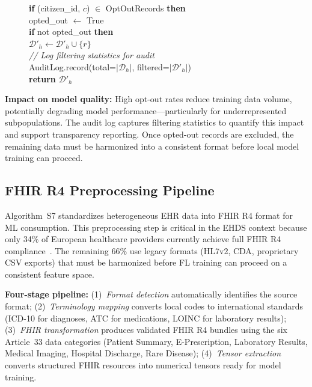 \documentclass[conference]{IEEEtran}
\begin{document}
\begin{figure}[htbp]
{{\hspace*{8mm}\textbf{if} (citizen\_id, $c$) $\in$ OptOutRecords \textbf{then}\\
\hspace*{12mm}opted\_out $\leftarrow$ True\\
\hspace*{4mm}\textbf{if} not opted\_out \textbf{then}\\
\hspace*{8mm}$\mathcal{D}'_h \leftarrow \mathcal{D}'_h \cup \{r\}$\\[2pt]
\textit{// Log filtering statistics for audit}\\
AuditLog.record(total=$|\mathcal{D}_h|$, filtered=$|\mathcal{D}'_h|$)\\
\textbf{return} $\mathcal{D}'_h$
}}
\end{figure}

\textbf{Impact on model quality:} High opt-out rates reduce training data volume, potentially degrading model performance---particularly for underrepresented subpopulations. The audit log captures filtering statistics to quantify this impact and support transparency reporting. Once opted-out records are excluded, the remaining data must be harmonized into a consistent format before local model training can proceed.

\subsection{FHIR R4 Preprocessing Pipeline}

Algorithm~S7 standardizes heterogeneous EHR data into FHIR R4 format for ML consumption. This preprocessing step is critical in the EHDS context because only 34\% of European healthcare providers currently achieve full FHIR R4 compliance~\cite{hussein2025interop}. The remaining 66\% use legacy formats (HL7v2, CDA, proprietary CSV exports) that must be harmonized before FL training can proceed on a consistent feature space.

\textbf{Four-stage pipeline:} (1)~\textit{Format detection} automatically identifies the source format; (2)~\textit{Terminology mapping} converts local codes to international standards (ICD-10 for diagnoses, ATC for medications, LOINC for laboratory results); (3)~\textit{FHIR transformation} produces validated FHIR R4 bundles using the six Article~33 data categories (Patient Summary, E-Prescription, Laboratory Results, Medical Imaging, Hospital Discharge, Rare Disease); (4)~\textit{Tensor extraction} converts structured FHIR resources into numerical tensors ready for model training.
\end{document}
